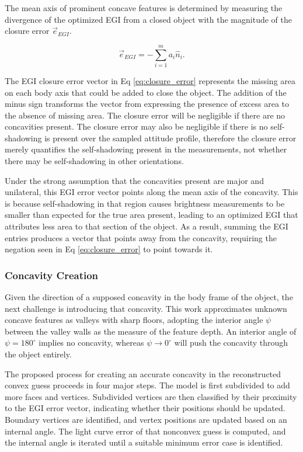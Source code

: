 The mean axis of prominent concave features is determined by measuring the divergence of the optimized EGI from a closed object with the magnitude of the closure error $\vec{e}_{EGI}$.

\begin{equation} \label{eq:closure_error}
  \vec{e}_{EGI} = -\sum_{i=1}^{m} a_i \hat{n}_i.
\end{equation}

The EGI closure error vector in Eq \ref{eq:closure_error} represents the missing area on each body axis that could be added to close the object. The addition of the minus sign transforms the vector from expressing the presence of excess area to the absence of missing area. The closure error will be negligible if there are no concavities present. The closure error may also be negligible if there is no self-shadowing is present over the sampled attitude profile, therefore the closure error merely quantifies the self-shadowing present in the measurements, not whether there may be self-shadowing in other orientations.

Under the strong assumption that the concavities present are major and unilateral, this EGI error vector points along the mean axis of the concavity. This is because self-shadowing in that region causes brightness measurements to be smaller than expected for the true area present, leading to an optimized EGI that attributes less area to that section of the object. As a result, summing the EGI entries produces a vector that points away from the concavity, requiring the negation seen in Eq \ref{eq:closure_error} to point towards it.

\subsubsection{Concavity Creation}

Given the direction of a supposed concavity in the body frame of the object, the next challenge is introducing that concavity. This work approximates unknown concave features as valleys with sharp floors, adopting the interior angle $\psi$ between the valley walls as the measure of the feature depth. An interior angle of $\psi=180^\circ$ implies no concavity, whereas $\psi \rightarrow 0^\circ$ will push the concavity through the object entirely.

The proposed process for creating an accurate concavity in the reconstructed convex guess proceeds in four major steps. The model is first subdivided to add more faces and vertices. Subdivided vertices are then classified by their proximity to the EGI error vector, indicating whether their positions should be updated. Boundary vertices are identified, and vertex positions are updated based on an internal angle. The light curve error of that nonconvex guess is computed, and the internal angle is iterated until a suitable minimum error case is identified.

